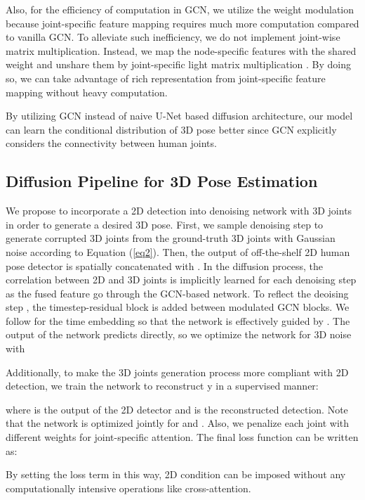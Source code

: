 \documentclass[letterpaper, 10 pt, conference]{ieeeconf}
\begin{document}
Also, for the efficiency of computation in GCN, we utilize the weight modulation \cite{zou2021modulated} because joint-specific feature mapping requires much more computation compared to vanilla GCN.
To alleviate such inefficiency, we do not implement joint-wise matrix multiplication.
Instead, we map the node-specific features with the shared weight and unshare them by joint-specific light matrix multiplication \cite{zou2021modulated}.
By doing so, we can take advantage of rich representation from joint-specific feature mapping without heavy computation.

By utilizing GCN instead of naive U-Net based diffusion architecture, our model can learn the conditional distribution of 3D pose better since GCN explicitly considers the connectivity between human joints.



\subsection{Diffusion Pipeline for 3D Pose Estimation}
We propose to incorporate a 2D detection into denoising network with 3D joints in order to generate a desired 3D pose.
First, we sample denoising step  to generate corrupted 3D joints  from the ground-truth 3D joints  with Gaussian noise  according to Equation (\ref{eq2}).
Then, the output of off-the-shelf 2D human pose detector  is spatially concatenated with .
In the diffusion process, the correlation between 2D and 3D joints is implicitly learned for each denoising step as the fused feature go through the GCN-based network.
To reflect the deoising step , the timestep-residual block is added between modulated GCN blocks.
We follow \cite{dhariwal2021diffusion} for the time embedding so that the network is effectively guided by .
The output of the network predicts  directly, so we optimize the network for 3D noise with

Additionally, to make the 3D joints generation process more compliant with 2D detection, we train the network to reconstruct y in a supervised manner:

where  is the output of the 2D detector and  is the reconstructed detection.
Note that the network is optimized jointly for  and .
Also, we penalize each joint with different weights for joint-specific attention.
The final loss function can be written as:

By setting the loss term in this way, 2D condition can be imposed without any computationally intensive operations like cross-attention.
\end{document}
